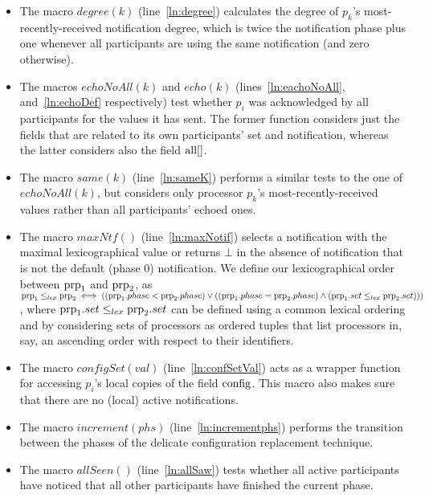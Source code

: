 \documentclass[11pt]{article}
\newcommand{\notif}{prp}
\begin{document}
\begin{itemize}

\item The macro $degree(k)$ (line~\ref{ln:degree}) calculates the degree of $p_k$'s most-recently-received notification degree, which is twice the notification phase plus one whenever all participants are using the same notification (and zero otherwise).
 

\item The macros $echoNoAll(k)$ and $echo(k)$ (lines~\ref{ln:eachoNoAll}, and~\ref{ln:echoDef} respectively) test whether $p_i$ was acknowledged by all participants for the values it has sent. The former function considers just the fields that are related to its own participants' set and notification, whereas the latter considers also the field $\textnormal{all}[]$. 

\item The macro $same(k)$ (line~\ref{ln:sameK}) performs a similar tests to the one of $echoNoAll(k)$, but considers only processor $p_k$'s most-recently-received values rather than all participants' echoed ones.


\item The macro $maxNtf()$ (line~\ref{ln:maxNotif}) selects a notification with the maximal lexicographical value or returns $\bot$ in the absence of notification that is not the default (phase 0) notification. We define our lexicographical order   between $\textnormal{\notif}_1$ and $\textnormal{\notif}_2$, as $\textnormal{\notif}_1 \leq_{lex}\textnormal{\notif}_2 \iff ((\textnormal{\notif}_1.phase <\textnormal{\notif}_2.phase) \lor ((\textnormal{\notif}_1.phase =\textnormal{\notif}_2.phase) \land (\textnormal{\notif}_1.set \leq_{lex}\textnormal{\notif}_2.set)))$, where $\textnormal{\notif}_1.set \leq_{lex}\textnormal{\notif}_2.set$ can be defined using a common lexical ordering and by considering sets of processors as ordered tuples that list processors in, say, an ascending order with respect to their identifiers.

\item The macro $configSet(val)$ (line~\ref{ln:confSetVal}) acts as a wrapper function for accessing $p_i$'s local copies of the field $\textnormal{config}$. This macro also makes sure that there are no (local) active notifications.

\item The macro $increment(phs)$ (line~\ref{ln:incrementphs}) performs the transition between the phases of the delicate configuration replacement technique.

\item The macro $allSeen()$ (line~\ref{ln:allSaw}) tests whether all active participants have noticed that all other participants have finished the current phase.


\end{itemize}
\end{document}
